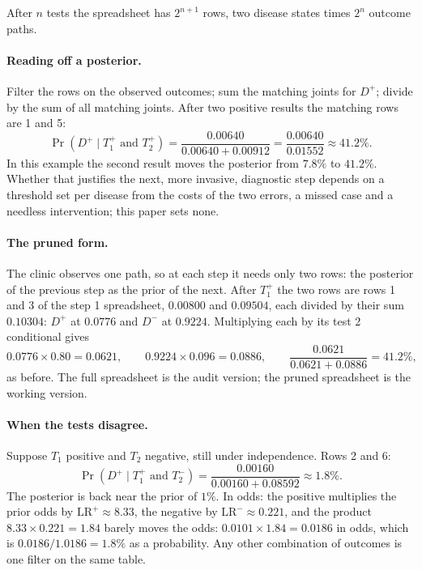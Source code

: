 \documentclass[11pt]{article}
\begin{document}
After $n$ tests the spreadsheet has $2^{n+1}$ rows, two disease states times $2^n$ outcome paths.

\paragraph{Reading off a posterior.} Filter the rows on the observed outcomes; sum the matching joints for $D^+$; divide by the sum of all matching joints. After two positive results the matching rows are 1 and 5:
\begin{equation*}
  \Pr(D^+ \mid T_1^+ \text{ and } T_2^+) = \frac{0.00640}{0.00640 + 0.00912} = \frac{0.00640}{0.01552} \approx 41.2\%.
\end{equation*}
In this example the second result moves the posterior from $7.8\%$ to $41.2\%$. Whether that justifies the next, more invasive, diagnostic step depends on a threshold set per disease from the costs of the two errors, a missed case and a needless intervention; this paper sets none.

\paragraph{The pruned form.} The clinic observes one path, so at each step it needs only two rows: the posterior of the previous step as the prior of the next. After $T_1^+$ the two rows are rows 1 and 3 of the step 1 spreadsheet, $0.00800$ and $0.09504$, each divided by their sum $0.10304$: $D^+$ at $0.0776$ and $D^-$ at $0.9224$. Multiplying each by its test 2 conditional gives
\begin{equation*}
  0.0776 \times 0.80 = 0.0621, \qquad 0.9224 \times 0.096 = 0.0886, \qquad \frac{0.0621}{0.0621 + 0.0886} = 41.2\%,
\end{equation*}
as before. The full spreadsheet is the audit version; the pruned spreadsheet is the working version.

\paragraph{When the tests disagree.} Suppose $T_1$ positive and $T_2$ negative, still under independence. Rows 2 and 6:
\begin{equation*}
  \Pr(D^+ \mid T_1^+ \text{ and } T_2^-) = \frac{0.00160}{0.00160 + 0.08592} \approx 1.8\%.
\end{equation*}
The posterior is back near the prior of $1\%$. In odds: the positive multiplies the prior odds by $\mathrm{LR}^+ \approx 8.33$, the negative by $\mathrm{LR}^- \approx 0.221$, and the product $8.33 \times 0.221 = 1.84$ barely moves the odds: $0.0101 \times 1.84 = 0.0186$ in odds, which is $0.0186 / 1.0186 = 1.8\%$ as a probability. Any other combination of outcomes is one filter on the same table.
\end{document}

